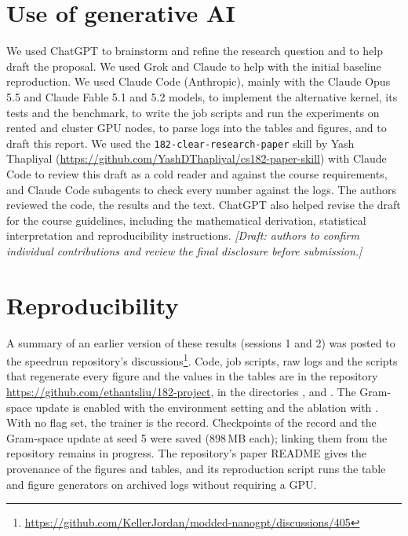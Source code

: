 \documentclass{article}
\begin{document}
\section{Use of generative AI}\label{app:ai}
We used ChatGPT to brainstorm and refine the research question and to help draft the proposal. We used Grok and Claude to help with the initial baseline reproduction. We used Claude Code (Anthropic), mainly with the Claude Opus 5.5 and Claude Fable 5.1 and 5.2 models, to implement the alternative kernel, its tests and the benchmark, to write the job scripts and run the experiments on rented and cluster GPU nodes, to parse logs into the tables and figures, and to draft this report. We used the \texttt{182-clear-research-paper} skill by Yash Thapliyal (\url{https://github.com/YashDThapliyal/cs182-paper-skill}) with Claude Code to review this draft as a cold reader and against the course requirements, and Claude Code subagents to check every number against the logs. The authors reviewed the code, the results and the text. ChatGPT also helped revise the draft for the course guidelines, including the mathematical derivation, statistical interpretation and reproducibility instructions. \emph{[Draft: authors to confirm individual contributions and review the final disclosure before submission.]}

\section{Reproducibility}\label{sec:repro}
A summary of an earlier version of these results (sessions 1 and 2) was posted to the speedrun repository's discussions\footnote{\url{https://github.com/KellerJordan/modded-nanogpt/discussions/405}}. Code, job scripts, raw logs and the scripts that regenerate every figure and the values in the tables are in the repository \url{https://github.com/ethantsliu/182-project}, in the directories ,  and . The Gram-space update is enabled with the environment setting  and the ablation with . With no flag set, the trainer is the record. Checkpoints of the record and the Gram-space update at seed 5 were saved ($898$\,MB each); linking them from the repository remains in progress. The repository's paper README gives the provenance of the figures and tables, and its reproduction script runs the table and figure generators on archived logs without requiring a GPU.
\end{document}
